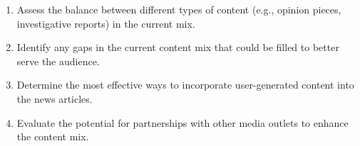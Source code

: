 \begin{footnotesize}
\begin{enumerate}[label={\(q_{\arabic*}\).},start=60]
\item Assess the balance between different types of content (e.g., opinion pieces, investigative reports) in the current mix.
\item Identify any gaps in the current content mix that could be filled to better serve the audience.
\item Determine the most effective ways to incorporate user-generated content into the news articles.
\item Evaluate the potential for partnerships with other media outlets to enhance the content mix.
\end{enumerate}
\end{footnotesize}
